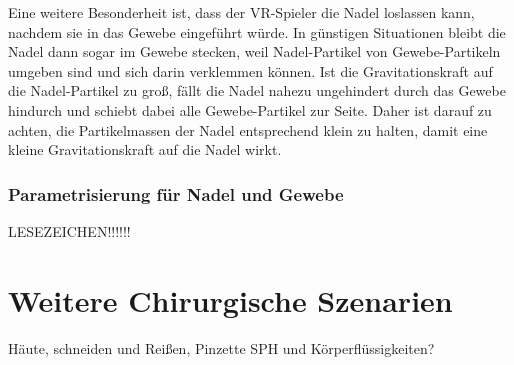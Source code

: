 
Eine weitere Besonderheit ist, dass der VR-Spieler die Nadel loslassen kann, nachdem sie in das Gewebe eingeführt würde. In günstigen Situationen bleibt die Nadel dann sogar im Gewebe stecken, weil Nadel-Partikel von Gewebe-Partikeln umgeben sind und sich darin verklemmen können. 
Ist die Gravitationskraft auf die Nadel-Partikel zu groß, fällt die Nadel nahezu ungehindert durch das Gewebe hindurch und schiebt dabei alle Gewebe-Partikel zur Seite. Daher ist darauf zu achten, die Partikelmassen der Nadel entsprechend klein zu halten, damit eine kleine Gravitationskraft auf die Nadel wirkt.

\subsubsection{Parametrisierung für Nadel und Gewebe}

LESEZEICHEN!!!!!!

\section{Weitere Chirurgische Szenarien}
Häute, schneiden und Reißen, Pinzette
SPH und Körperflüssigkeiten?





